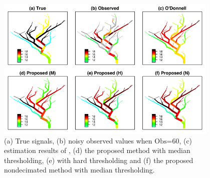 \documentclass[11pt,titlepage]{article}
\begin{document}
\begin{figure}
	\centering\includegraphics[width=0.95\textwidth]{Stream_Result/SLifting_Comp_03.png}
	\vspace{-4mm}\caption{(a) True signals, (b) noisy observed values when $\text{Obs=60}$, (c) estimation results of \cite{ODonnell2014}, (d) the proposed method with median thresholding, (e) with hard thresholding and (f) the proposed nondecimated method with median thresholding.} %
	\label{fig:streamsimresult2}
\end{figure}




\end{document}
